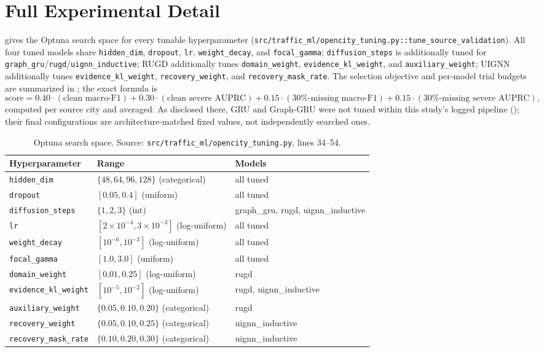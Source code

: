 \section{Full Experimental Detail}
\label{app:hyperparameters}

 gives the Optuna search space for every tunable hyperparameter
(\texttt{src/traffic\_ml/opencity\_tuning.py::tune\_source\_validation}). All four tuned models
share \texttt{hidden\_dim}, \texttt{dropout}, \texttt{lr}, \texttt{weight\_decay}, and
\texttt{focal\_gamma}; \texttt{diffusion\_steps} is additionally tuned for
\texttt{graph\_gru}/\texttt{rugd}/\texttt{uignn\_inductive}; RUGD additionally tunes
\texttt{domain\_weight}, \texttt{evidence\_kl\_weight}, and \texttt{auxiliary\_weight}; UIGNN
additionally tunes \texttt{evidence\_kl\_weight}, \texttt{recovery\_weight}, and
\texttt{recovery\_mask\_rate}. The selection objective and per-model trial budgets are summarized in
; the exact formula is
\[
  \mathrm{score} = 0.40\cdot(\text{clean macro-F1}) + 0.30\cdot(\text{clean severe AUPRC})
  + 0.15\cdot(\text{30\%-missing macro-F1}) + 0.15\cdot(\text{30\%-missing severe AUPRC}),
\]
computed per source city and averaged. As disclosed there, GRU and Graph-GRU were not tuned within
this study's logged pipeline (); their final configurations are
architecture-matched fixed values, not independently searched ones.

\begin{table}[h]
\centering
\caption{Optuna search space. Source: \texttt{src/traffic\_ml/opencity\_tuning.py}, lines 34--54.}
\label{tab:search-space}
\begin{tabular}{lll}
\toprule
Hyperparameter & Range & Models \\
\midrule
\texttt{hidden\_dim} & $\{48, 64, 96, 128\}$ (categorical) & all tuned \\
\texttt{dropout} & $[0.05, 0.4]$ (uniform) & all tuned \\
\texttt{diffusion\_steps} & $\{1,2,3\}$ (int) & graph\_gru, rugd, uignn\_inductive \\
\texttt{lr} & $[2\times10^{-4}, 3\times10^{-3}]$ (log-uniform) & all tuned \\
\texttt{weight\_decay} & $[10^{-6}, 10^{-3}]$ (log-uniform) & all tuned \\
\texttt{focal\_gamma} & $[1.0, 3.0]$ (uniform) & all tuned \\
\texttt{domain\_weight} & $[0.01, 0.25]$ (log-uniform) & rugd \\
\texttt{evidence\_kl\_weight} & $[10^{-5}, 10^{-2}]$ (log-uniform) & rugd, uignn\_inductive \\
\texttt{auxiliary\_weight} & $\{0.05, 0.10, 0.20\}$ (categorical) & rugd \\
\texttt{recovery\_weight} & $\{0.05, 0.10, 0.25\}$ (categorical) & uignn\_inductive \\
\texttt{recovery\_mask\_rate} & $\{0.10, 0.20, 0.30\}$ (categorical) & uignn\_inductive \\
\bottomrule
\end{tabular}
\end{table}

